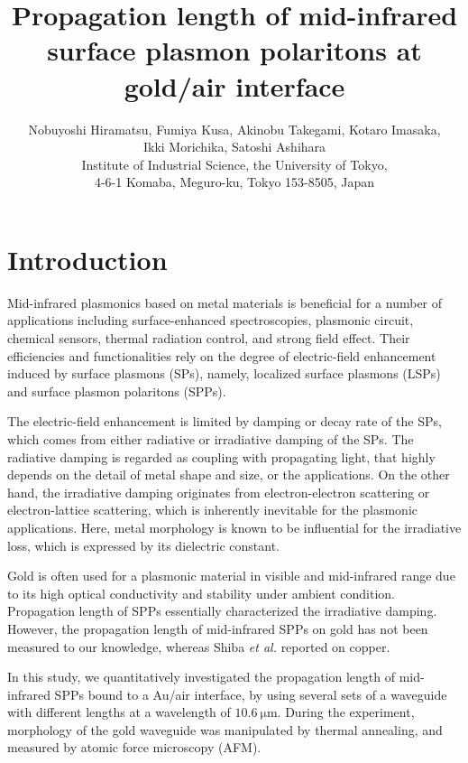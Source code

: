 \documentclass[twocolumn,10.5pt,a4]{article}
\begin{document}
\title{Propagation length of mid-infrared surface plasmon polaritons at gold/air interface}
\author{Nobuyoshi Hiramatsu, Fumiya Kusa, Akinobu Takegami, Kotaro Imasaka,  \\Ikki Morichika, Satoshi Ashihara\\ Institute of Industrial Science, the University of Tokyo, \\4-6-1 Komaba, Meguro-ku, Tokyo 153-8505, Japan}
\maketitle

\section{Introduction}
Mid-infrared plasmonics based on metal materials is beneficial for a number of applications including surface-enhanced spectroscopies\cite{Osawa}\cite{Neubrech}, plasmonic circuit\cite{Ebbesen}, chemical sensors\cite{Matthew}, thermal radiation control\cite{Takahara}, and strong field effect\cite{Kusa2015}. 
Their efficiencies and functionalities rely on the degree of electric-field enhancement induced by surface plasmons (SPs), namely, localized surface plasmons (LSPs) and surface plasmon polaritons (SPPs).

The electric-field enhancement is limited by damping or decay rate of the SPs, which comes from either radiative or irradiative damping of the SPs. 
The radiative damping is regarded as coupling with propagating light, that highly depends on the detail of metal shape and size, or the applications. On the other hand, the irradiative damping originates from electron-electron scattering or electron-lattice scattering, which is inherently inevitable for the plasmonic applications. Here, metal morphology is known to be influential for the irradiative loss, which is expressed by its dielectric constant\cite{Jens}\cite{Hunghua}.

Gold is often used for a plasmonic material in visible and mid-infrared range due to its high optical conductivity and stability under ambient condition. Propagation length of SPPs essentially characterized the irradiative damping. 
However, the propagation length of mid-infrared SPPs on gold has not been measured to our knowledge, whereas Shiba {\it et al.} reported on copper\cite{Shiba}.

In this study, we quantitatively investigated the propagation length of mid-infrared SPPs bound to a Au/air interface, by using several sets of a waveguide with different lengths at a wavelength of $10.6\:\mathrm{\mu m}$. 
During the experiment, morphology of the gold waveguide was manipulated by thermal annealing, and measured by atomic force microscopy (AFM). 
\end{document}
